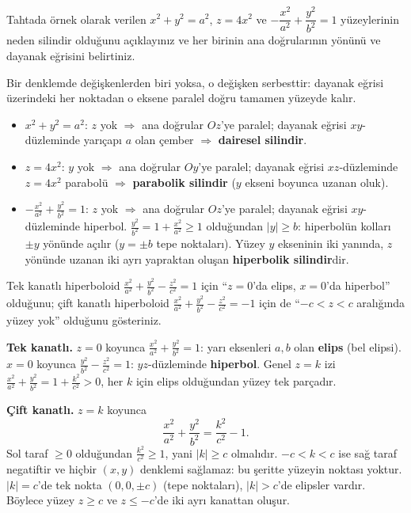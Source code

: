 \begin{soru}
Tahtada örnek olarak verilen $x^2+y^2=a^2$, $z=4x^2$ ve $-\dfrac{x^2}{a^2}+\dfrac{y^2}{b^2}=1$ yüzeylerinin neden silindir olduğunu açıklayınız ve her birinin ana doğrularının yönünü ve dayanak eğrisini belirtiniz.
\end{soru}
\begin{cevap}
Bir denklemde değişkenlerden biri yoksa, o değişken serbesttir: dayanak eğrisi üzerindeki her noktadan o eksene paralel doğru tamamen yüzeyde kalır.
\begin{itemize}
  \item $x^2+y^2=a^2$: $z$ yok $\Rightarrow$ ana doğrular $Oz$'ye paralel; dayanak eğrisi $xy$-düzleminde yarıçapı $a$ olan çember $\Rightarrow$ \textbf{dairesel silindir}.
  \item $z=4x^2$: $y$ yok $\Rightarrow$ ana doğrular $Oy$'ye paralel; dayanak eğrisi $xz$-düzleminde $z=4x^2$ parabolü $\Rightarrow$ \textbf{parabolik silindir} ($y$ ekseni boyunca uzanan oluk).
  \item $-\frac{x^2}{a^2}+\frac{y^2}{b^2}=1$: $z$ yok $\Rightarrow$ ana doğrular $Oz$'ye paralel; dayanak eğrisi $xy$-düzleminde hiperbol. $\frac{y^2}{b^2}=1+\frac{x^2}{a^2}\ge1$ olduğundan $|y|\ge b$: hiperbolün kolları $\pm y$ yönünde açılır ($y=\pm b$ tepe noktaları). Yüzey $y$ ekseninin iki yanında, $z$ yönünde uzanan iki ayrı yapraktan oluşan \textbf{hiperbolik silindir}dir.
\end{itemize}
\end{cevap}

\begin{soru}
Tek kanatlı hiperboloid $\frac{x^2}{a^2}+\frac{y^2}{b^2}-\frac{z^2}{c^2}=1$ için ``$z=0$'da elips, $x=0$'da hiperbol'' olduğunu; çift kanatlı hiperboloid $\frac{x^2}{a^2}+\frac{y^2}{b^2}-\frac{z^2}{c^2}=-1$ için de ``$-c<z<c$ aralığında yüzey yok'' olduğunu gösteriniz.
\end{soru}
\begin{cevap}
\textbf{Tek kanatlı.} $z=0$ koyunca $\frac{x^2}{a^2}+\frac{y^2}{b^2}=1$: yarı eksenleri $a,b$ olan \textbf{elips} (bel elipsi). $x=0$ koyunca $\frac{y^2}{b^2}-\frac{z^2}{c^2}=1$: $yz$-düzleminde \textbf{hiperbol}. Genel $z=k$ izi $\frac{x^2}{a^2}+\frac{y^2}{b^2}=1+\frac{k^2}{c^2}>0$, her $k$ için elips olduğundan yüzey tek parçadır.

\textbf{Çift kanatlı.} $z=k$ koyunca
\[ \frac{x^2}{a^2}+\frac{y^2}{b^2}=\frac{k^2}{c^2}-1 . \]
Sol taraf $\ge0$ olduğundan $\frac{k^2}{c^2}\ge1$, yani $|k|\ge c$ olmalıdır. $-c<k<c$ ise sağ taraf negatiftir ve hiçbir $(x,y)$ denklemi sağlamaz: bu şeritte yüzeyin noktası yoktur. $|k|=c$'de tek nokta $(0,0,\pm c)$ (tepe noktaları), $|k|>c$'de elipsler vardır. Böylece yüzey $z\ge c$ ve $z\le-c$'de iki ayrı kanattan oluşur.
\end{cevap}

